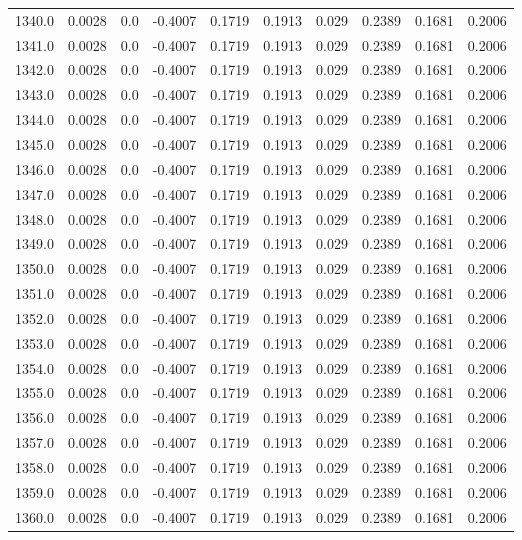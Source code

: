 \begin{longtable}{lrrrrrrrrr}
1340.0 & 0.0028 & 0.0 & -0.4007 & 0.1719 & 0.1913 & 0.029 & 0.2389 & 0.1681 & 0.2006 \\
1341.0 & 0.0028 & 0.0 & -0.4007 & 0.1719 & 0.1913 & 0.029 & 0.2389 & 0.1681 & 0.2006 \\
1342.0 & 0.0028 & 0.0 & -0.4007 & 0.1719 & 0.1913 & 0.029 & 0.2389 & 0.1681 & 0.2006 \\
1343.0 & 0.0028 & 0.0 & -0.4007 & 0.1719 & 0.1913 & 0.029 & 0.2389 & 0.1681 & 0.2006 \\
1344.0 & 0.0028 & 0.0 & -0.4007 & 0.1719 & 0.1913 & 0.029 & 0.2389 & 0.1681 & 0.2006 \\
1345.0 & 0.0028 & 0.0 & -0.4007 & 0.1719 & 0.1913 & 0.029 & 0.2389 & 0.1681 & 0.2006 \\
1346.0 & 0.0028 & 0.0 & -0.4007 & 0.1719 & 0.1913 & 0.029 & 0.2389 & 0.1681 & 0.2006 \\
1347.0 & 0.0028 & 0.0 & -0.4007 & 0.1719 & 0.1913 & 0.029 & 0.2389 & 0.1681 & 0.2006 \\
1348.0 & 0.0028 & 0.0 & -0.4007 & 0.1719 & 0.1913 & 0.029 & 0.2389 & 0.1681 & 0.2006 \\
1349.0 & 0.0028 & 0.0 & -0.4007 & 0.1719 & 0.1913 & 0.029 & 0.2389 & 0.1681 & 0.2006 \\
1350.0 & 0.0028 & 0.0 & -0.4007 & 0.1719 & 0.1913 & 0.029 & 0.2389 & 0.1681 & 0.2006 \\
1351.0 & 0.0028 & 0.0 & -0.4007 & 0.1719 & 0.1913 & 0.029 & 0.2389 & 0.1681 & 0.2006 \\
1352.0 & 0.0028 & 0.0 & -0.4007 & 0.1719 & 0.1913 & 0.029 & 0.2389 & 0.1681 & 0.2006 \\
1353.0 & 0.0028 & 0.0 & -0.4007 & 0.1719 & 0.1913 & 0.029 & 0.2389 & 0.1681 & 0.2006 \\
1354.0 & 0.0028 & 0.0 & -0.4007 & 0.1719 & 0.1913 & 0.029 & 0.2389 & 0.1681 & 0.2006 \\
1355.0 & 0.0028 & 0.0 & -0.4007 & 0.1719 & 0.1913 & 0.029 & 0.2389 & 0.1681 & 0.2006 \\
1356.0 & 0.0028 & 0.0 & -0.4007 & 0.1719 & 0.1913 & 0.029 & 0.2389 & 0.1681 & 0.2006 \\
1357.0 & 0.0028 & 0.0 & -0.4007 & 0.1719 & 0.1913 & 0.029 & 0.2389 & 0.1681 & 0.2006 \\
1358.0 & 0.0028 & 0.0 & -0.4007 & 0.1719 & 0.1913 & 0.029 & 0.2389 & 0.1681 & 0.2006 \\
1359.0 & 0.0028 & 0.0 & -0.4007 & 0.1719 & 0.1913 & 0.029 & 0.2389 & 0.1681 & 0.2006 \\
1360.0 & 0.0028 & 0.0 & -0.4007 & 0.1719 & 0.1913 & 0.029 & 0.2389 & 0.1681 & 0.2006 \\

\end{longtable}
